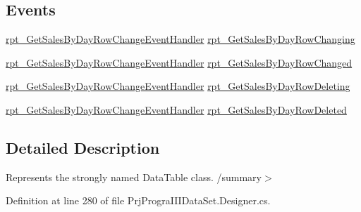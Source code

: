 \subsection*{Events}
\begin{DoxyCompactItemize}
\item 
\hyperlink{classprj_progra_i_i_i_1_1_prj_progra_i_i_i_data_set_aa1d46bd3c23f7f4fb63afc2bdb363a5b}{rpt\+\_\+\+Get\+Sales\+By\+Day\+Row\+Change\+Event\+Handler} \hyperlink{classprj_progra_i_i_i_1_1_prj_progra_i_i_i_data_set_1_1rpt___get_sales_by_day_data_table_a7dd959a6d2cd2a58cc1fe78b94413247}{rpt\+\_\+\+Get\+Sales\+By\+Day\+Row\+Changing}
\item 
\hyperlink{classprj_progra_i_i_i_1_1_prj_progra_i_i_i_data_set_aa1d46bd3c23f7f4fb63afc2bdb363a5b}{rpt\+\_\+\+Get\+Sales\+By\+Day\+Row\+Change\+Event\+Handler} \hyperlink{classprj_progra_i_i_i_1_1_prj_progra_i_i_i_data_set_1_1rpt___get_sales_by_day_data_table_a4c79f8500523fc5268a3622b3c3139b9}{rpt\+\_\+\+Get\+Sales\+By\+Day\+Row\+Changed}
\item 
\hyperlink{classprj_progra_i_i_i_1_1_prj_progra_i_i_i_data_set_aa1d46bd3c23f7f4fb63afc2bdb363a5b}{rpt\+\_\+\+Get\+Sales\+By\+Day\+Row\+Change\+Event\+Handler} \hyperlink{classprj_progra_i_i_i_1_1_prj_progra_i_i_i_data_set_1_1rpt___get_sales_by_day_data_table_adebe3f4a124071223ec3938a142969bd}{rpt\+\_\+\+Get\+Sales\+By\+Day\+Row\+Deleting}
\item 
\hyperlink{classprj_progra_i_i_i_1_1_prj_progra_i_i_i_data_set_aa1d46bd3c23f7f4fb63afc2bdb363a5b}{rpt\+\_\+\+Get\+Sales\+By\+Day\+Row\+Change\+Event\+Handler} \hyperlink{classprj_progra_i_i_i_1_1_prj_progra_i_i_i_data_set_1_1rpt___get_sales_by_day_data_table_adbaa8db2475a2883a3b0ae03be9b071e}{rpt\+\_\+\+Get\+Sales\+By\+Day\+Row\+Deleted}
\end{DoxyCompactItemize}


\subsection{Detailed Description}
Represents the strongly named Data\+Table class. /summary$>$ 

Definition at line 280 of file Prj\+Progra\+I\+I\+I\+Data\+Set.\+Designer.\+cs.



